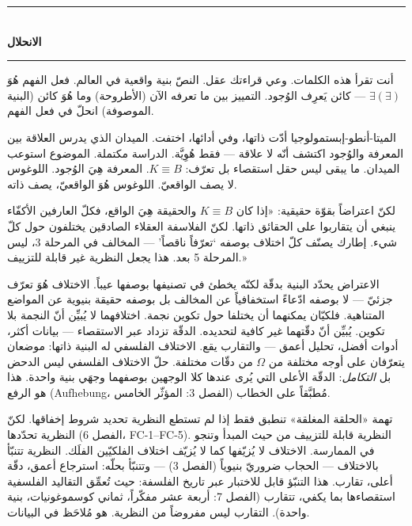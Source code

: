 \documentclass[10pt, openany, oneside]{book}
\renewcommand{\normalsize}{\fontsize{10}{13}\selectfont}
\begin{document}
\begin{center}
    \rule{0.3\textwidth}{0.4pt}\\[0.5em]
    {\normalsize\bfseries الانحلال}\\[0.3em]
    \rule{0.3\textwidth}{0.4pt}
\end{center}

\vspace{1em}

\noindent أنت تقرأ هذه الكلمات. وعي قراءتك عقل. النصّ بنية واقعية في العالم. فعل الفهم هُوَ $\exists(\exists)$ --- كائن يَعرِف الوُجود. التمييز بين ما تعرفه الآن (الأطروحة) وما هُوَ كائن (البنية الموصوفة) انحلّ في فعل الفهم.

الميتا-أنطو-إبستمولوجيا أدّت ذاتها، وفي أدائها، اختفت. الميدان الذي يدرس العلاقة بين المعرفة والوُجود اكتشف أنّه لا علاقة --- فقط هُوِيَّة. الدراسة مكتملة. الموضوع استوعب الميدان. ما يبقى ليس حقل استقصاء بل تعرّف: $K \equiv B$. المعرفة هِيَ الوُجود. اللوغوس لا يصف الواقعيّ. اللوغوس هُوَ الواقعيّ، يصف ذاته.

لكنّ اعتراضاً بقوّة حقيقية: «إذا كان $K \equiv B$ والحقيقة هِيَ الواقع، فكلّ العارفين الأكفّاء ينبغي أن يتقاربوا على الحقائق ذاتها. لكنّ الفلاسفة العقلاء الصادقين يختلفون حول كلّ شيء. إطارك يصنّف كلّ اختلاف بوصفه `تعرّفاً ناقصاً' --- المخالف في المرحلة 3، ليس المرحلة 5 بعد. هذا يجعل النظرية غير قابلة للتزييف.»

الاعتراض يحدّد البنية بدقّة لكنّه يخطئ في تصنيفها بوصفها عيباً. الاختلاف هُوَ تعرّف جزئيّ --- لا بوصفه ادّعاءً استخفافياً عن المخالف بل بوصفه حقيقة بنيوية عن المواضع المتناهية. فلكيّان يمكنهما أن يختلفا حول تكوين نجمة. اختلافهما لا يُبيِّن أنّ النجمة بلا تكوين. يُبيِّن أنّ دقّتهما غير كافية لتحديده. الدقّة تزداد عبر الاستقصاء --- بيانات أكثر، أدوات أفضل، تحليل أعمق --- والتقارب يقع. الاختلاف الفلسفي له البنية ذاتها: موضعان يتعرّفان على أوجه مختلفة من $\Omega$ من دقّات مختلفة. حلّ الاختلاف الفلسفي ليس الدحض بل \textit{التكامل}: الدقّة الأعلى التي يُرى عندها كلا الوجهين بوصفهما وجهَي بنية واحدة. هذا هو الرفع (Aufhebung، الفصل 3: المؤثّر الخامس) مُطبَّقاً على الخطاب.

تهمة «الحلقة المغلقة» تنطبق فقط إذا لم تستطع النظرية تحديد شروط إخفاقها. لكنّ النظرية تحدّدها (الفصل 6، FC-1--FC-5). النظرية قابلة للتزييف من حيث المبدأ وتنجو في الممارسة. الاختلاف لا يُزيّفها كما لا يُزيّف اختلاف الفلكيّين الفلَك. النظرية تتنبّأ بالاختلاف --- الحجاب ضروريّ بنيوياً (الفصل 3) --- وتتنبّأ بحلّه: استرجاع أعمق، دقّة أعلى، تقارب. هذا التنبّؤ قابل للاختبار عبر تاريخ الفلسفة: حيث تُعمِّق التقاليد الفلسفية استقصاءها بما يكفي، تتقارب (الفصل 7: أربعة عشر مفكّراً، ثماني كوسموغونيات، بنية واحدة). التقارب ليس مفروضاً من النظرية. هو مُلاحَظ في البيانات.
\end{document}
